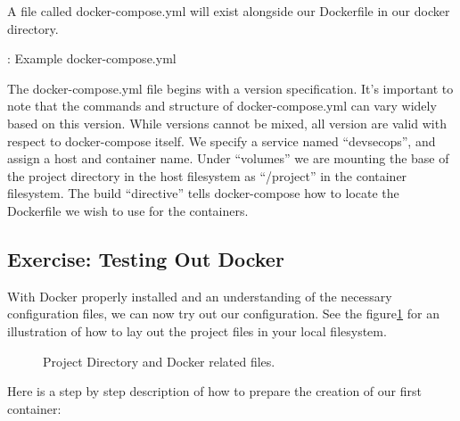 \justify{}
A file called docker-compose.yml will exist
alongside our Dockerfile in our docker directory.

\begin{mybox}{\thetcbcounter: Example docker-compose.yml}
  
\end{mybox}

\justify
The docker-compose.yml file begins with a version specification. It's
important to note that the commands and structure of docker-compose.yml
can vary widely based on this version. While versions cannot be mixed,
all version are valid with respect to docker-compose itself. We specify
a service named ``devsecops'', and assign a host and container name. Under
``volumes'' we are mounting the base of the project directory in the host
filesystem as ``/project'' in the container filesystem. The build
``directive'' tells docker-compose how to locate the Dockerfile we wish to
use for the containers.

\subsection{Exercise: Testing Out Docker}
\justify{}
With Docker properly installed and an understanding of the necessary
configuration files, we can now try out our configuration. See the 
figure\ref{githubdirectory} for an illustration of how to lay out the
project files in your local filesystem.

\begin{figure}[!htb]
  \centering
  
  \caption{Project Directory and Docker related files.}
\label{githubdirectory}
\end{figure}

\clearpage
\justify{}
Here is a step by step description of how to prepare the creation of
our first container:

